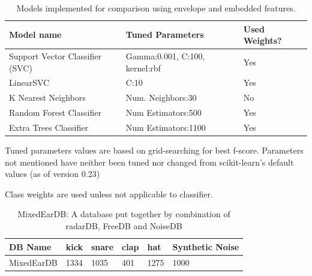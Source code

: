 \documentclass[\main/thesis.tex]{subfiles}
\begin{document}
\begin{table}[t]
    \centering \hspace*{-0.8cm}
    \begin{threeparttable}
    \begin{tabular}[width=0.95\paperwidth]{|l|l|l|}
    \hline
    Model name & Tuned Parameters\tnote{\dag}  & Used Weights? \tnote{\ddag} \\\hline
     Support Vector Classifier (SVC) &  Gamma:0.001, C:100, kernel:rbf & Yes\\
     LinearSVC & C:10 & Yes\\
     K Nearest Neighbors & Num. Neighbors:30 &  No \\
     Random Forest Classifier & Num Estimators:500 & Yes \\
     Extra Trees Classifier & Num Estimators:1100 & Yes\\
     \hline
    \end{tabular}
    \caption{Models implemented for comparison using envelope and embedded features. }
    \begin{tablenotes}
    \item[\dag] Tuned parameters values are based on grid-searching for best f-score. Parameters not mentioned have neither been tuned nor changed from scikit-learn's default values (as of version 0.23)
    \item[\ddag] Class weights are used unless not applicable to classifier.
    \end{tablenotes}
    \label{table:mem_model_selection}
    \end{threeparttable}
\end{table}
\begin{table}[hp!]
\centering
\begin{tabular}{|l|l|l|l|l|l|}
\hline
 DB Name & kick & snare & clap & hat & Synthetic Noise\\\hline
 MixedEarDB & 1334 & 1035 & 401 & 1275 & 1000 \\ \hline
\end{tabular}
\caption{MixedEarDB: A database put together by combination of radarDB, FreeDB and NoiseDB}
\label{db:memDB}
\end{table}
\end{document}

